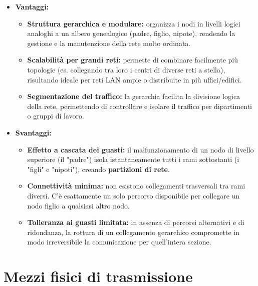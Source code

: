 \documentclass[a4paper,12pt]{report}
\begin{document}
\begin{itemize}[leftmargin=*]
  \item \textbf{Vantaggi:}
  \begin{itemize}
    \item \textbf{Struttura gerarchica e modulare:} organizza i nodi in livelli logici analoghi a un albero genealogico (padre, figlio, nipote), rendendo la gestione e la manutenzione della rete molto ordinata.
    \item \textbf{Scalabilità per grandi reti:} permette di combinare facilmente più topologie (es. collegando tra loro i centri di diverse reti a stella), risultando ideale per reti LAN ampie o distribuite in più uffici/edifici.
    \item \textbf{Segmentazione del traffico:} la gerarchia facilita la divisione logica della rete, permettendo di controllare e isolare il traffico per dipartimenti o gruppi di lavoro.
  \end{itemize}

  \item \textbf{Svantaggi:}
  \begin{itemize}
    \item \textbf{Effetto a cascata dei guasti:} il malfunzionamento di un nodo di livello superiore (il "padre") isola istantaneamente tutti i rami sottostanti (i "figli" e "nipoti"), creando \textbf{partizioni di rete}.
    \item \textbf{Connettività minima:} non esistono collegamenti trasversali tra rami diversi. C'è esattamente un solo percorso disponibile per collegare un nodo figlio a qualsiasi altro nodo.
    \item \textbf{Tolleranza ai guasti limitata:} in assenza di percorsi alternativi e di ridondanza, la rottura di un collegamento gerarchico compromette in modo irreversibile la comunicazione per quell'intera sezione.
  \end{itemize}
\end{itemize}
\vspace{1cm}

\section{Mezzi fisici di trasmissione}
\end{document}
